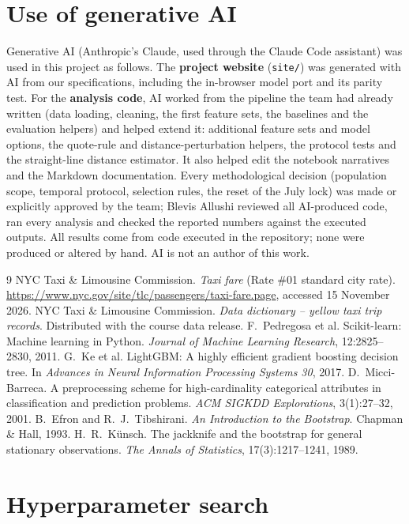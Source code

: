 \documentclass[11pt,a4paper]{article}
\newcommand{\code}[1]{\texttt{#1}}
\begin{document}
\section*{Use of generative AI}
Generative AI (Anthropic's Claude, used through the Claude Code assistant) was used in this project as follows. The \textbf{project website} (\code{site/}) was generated with AI from our specifications, including the in-browser model port and its parity test. For the \textbf{analysis code}, AI worked from the pipeline the team had already written (data loading, cleaning, the first feature sets, the baselines and the evaluation helpers) and helped extend it: additional feature sets and model options, the quote-rule and distance-perturbation helpers, the protocol tests and the straight-line distance estimator. It also helped edit the notebook narratives and the Markdown documentation. Every methodological decision (population scope, temporal protocol, selection rules, the reset of the July lock) was made or explicitly approved by the team; Blevis Allushi reviewed all AI-produced code, ran every analysis and checked the reported numbers against the executed outputs. All results come from code executed in the repository; none were produced or altered by hand. AI is not an author of this work.

\begin{thebibliography}{9}\small
{} NYC Taxi \& Limousine Commission. \emph{Taxi fare} (Rate \#01 standard city rate). \url{https://www.nyc.gov/site/tlc/passengers/taxi-fare.page}, accessed 15 November 2026.
 NYC Taxi \& Limousine Commission. \emph{Data dictionary -- yellow taxi trip records}. Distributed with the course data release.
 F.~Pedregosa et al. Scikit-learn: Machine learning in Python. \emph{Journal of Machine Learning Research}, 12:2825--2830, 2011.
 G.~Ke et al. LightGBM: A highly efficient gradient boosting decision tree. In \emph{Advances in Neural Information Processing Systems 30}, 2017.
 D.~Micci-Barreca. A preprocessing scheme for high-cardinality categorical attributes in classification and prediction problems. \emph{ACM SIGKDD Explorations}, 3(1):27--32, 2001.
 B.~Efron and R.~J.~Tibshirani. \emph{An Introduction to the Bootstrap}. Chapman \& Hall, 1993.
 H.~R.~K\"unsch. The jackknife and the bootstrap for general stationary observations. \emph{The Annals of Statistics}, 17(3):1217--1241, 1989.
\end{thebibliography}

\appendix
\section{Hyperparameter search}
\TableHgbgrid
\end{document}
